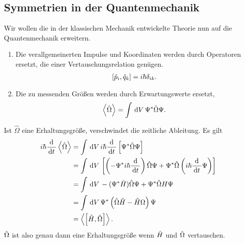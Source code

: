 \subsection{Symmetrien in der Quantenmechanik}
Wir wollen die in der klassischen Mechanik entwickelte Theorie nun auf die
Quantenmechanik erweitern.
\begin{enumerate}[label=\arabic{*}.)]
\item Die verallgemeinerten Impulse und Koordinaten werden durch Operatoren
  ersetzt, die einer Vertauschungsrelation genügen.
  \begin{align*}
  \left[\hat{p}_i,\hat{q}_k\right] = i\hbar\delta_{ik}.
  \end{align*}
\item Die zu messenden Größen werden durch Erwartungswerte ersetzt,
\begin{align*}
\left\langle\hat{\Omega}\right\rangle = \int \,\mathrm{d} V\, \Psi^* \hat{\Omega}\Psi.
\end{align*}
\end{enumerate}
Ist $\hat{\Omega}$ eine Erhaltungsgröße, verschwindet die zeitliche Ableitung.
Es gilt 
\begin{align*}
i\hbar \frac{\mathrm{d}}{\,\mathrm{d} t\,}\left\langle\hat{\Omega}\right\rangle
&= \int\,\mathrm{d} V\, i\hbar \frac{\mathrm{d}}{\,\mathrm{d} t\,}\left[\Psi^*\hat{\Omega}\Psi\right]
\\&= \int \,\mathrm{d} V\, \left[\left(-\Psi^*i\hbar\frac{\mathrm{d}}{\,\mathrm{d} t\,}\right)\hat{\Omega}\Psi
 + \Psi^*\hat{\Omega}\left(i\hbar\frac{\mathrm{d}}{\,\mathrm{d} t\,}\Psi\right)\right]
\\ &= \int\,\mathrm{d} V\, -(\Psi^*\hat{H})\hat{\Omega}\Psi + \Psi^*\hat{\Omega}H\Psi
\\ &= \int\,\mathrm{d} V\, \Psi^*\left(\hat{\Omega}\hat{H} - \hat{H}\Omega\right)\Psi
\\ &= \left\langle\left[\hat{H},\hat{\Omega}\right]\right\rangle. 
\end{align*}
$\hat{\boldmath{\Omega}}$ ist also genau dann eine Erhaltungsgröße wenn $\hat{\boldmath{H}}$ und
$\hat{\boldmath{\Omega}}$ vertauschen.
